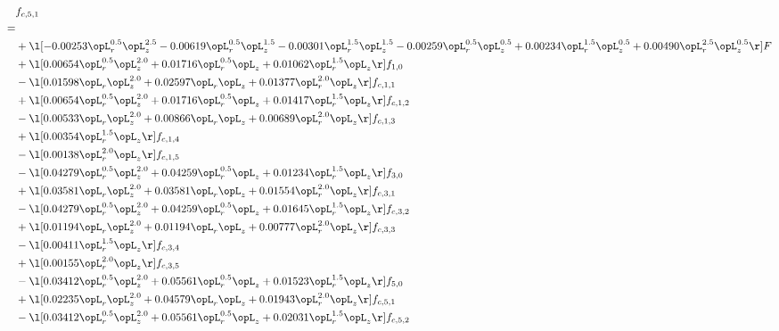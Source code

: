 \begin{alignat}{2} 
\label{eq:f_51_1} 
& f_{c,5,1} \nonumber \\ 
 = \\ 
& + \l[  -0.00253 \opL_r^{0.5} \opL_z^{2.5}   -0.00619 \opL_r^{0.5} \opL_z^{1.5}   -0.00301 \opL_r^{1.5} \opL_z^{1.5}   -0.00259 \opL_r^{0.5} \opL_z^{0.5} +  0.00234 \opL_r^{1.5} \opL_z^{0.5} +  0.00490 \opL_r^{2.5} \opL_z^{0.5}  \r] F \nonumber \\ 
& + \l[  0.00654 \opL_r^{0.5} \opL_z^{2.0} +  0.01716 \opL_r^{0.5} \opL_z +  0.01062 \opL_r^{1.5} \opL_z  \r] f_{1,0} \nonumber \\ 
& - \l[  0.01598 \opL_r \opL_z^{2.0} +  0.02597 \opL_r \opL_z +  0.01377 \opL_r^{2.0} \opL_z  \r] f_{c,1,1} \nonumber \\ 
& + \l[  0.00654 \opL_r^{0.5} \opL_z^{2.0} +  0.01716 \opL_r^{0.5} \opL_z +  0.01417 \opL_r^{1.5} \opL_z  \r] f_{c,1,2} \nonumber \\ 
& - \l[  0.00533 \opL_r \opL_z^{2.0} +  0.00866 \opL_r \opL_z +  0.00689 \opL_r^{2.0} \opL_z  \r] f_{c,1,3} \nonumber \\ 
& + \l[  0.00354 \opL_r^{1.5} \opL_z  \r] f_{c,1,4} \nonumber \\ 
& - \l[  0.00138 \opL_r^{2.0} \opL_z  \r] f_{c,1,5} \nonumber \\ 
& - \l[  0.04279 \opL_r^{0.5} \opL_z^{2.0} +  0.04259 \opL_r^{0.5} \opL_z +  0.01234 \opL_r^{1.5} \opL_z  \r] f_{3,0} \nonumber \\ 
& + \l[  0.03581 \opL_r \opL_z^{2.0} +  0.03581 \opL_r \opL_z +  0.01554 \opL_r^{2.0} \opL_z  \r] f_{c,3,1} \nonumber \\ 
& - \l[  0.04279 \opL_r^{0.5} \opL_z^{2.0} +  0.04259 \opL_r^{0.5} \opL_z +  0.01645 \opL_r^{1.5} \opL_z  \r] f_{c,3,2} \nonumber \\ 
& + \l[  0.01194 \opL_r \opL_z^{2.0} +  0.01194 \opL_r \opL_z +  0.00777 \opL_r^{2.0} \opL_z  \r] f_{c,3,3} \nonumber \\ 
& - \l[  0.00411 \opL_r^{1.5} \opL_z  \r] f_{c,3,4} \nonumber \\ 
& + \l[  0.00155 \opL_r^{2.0} \opL_z  \r] f_{c,3,5} \nonumber \\ 
& - \l[  0.03412 \opL_r^{0.5} \opL_z^{2.0} +  0.05561 \opL_r^{0.5} \opL_z +  0.01523 \opL_r^{1.5} \opL_z  \r] f_{5,0} \nonumber \\ 
& + \l[  0.02235 \opL_r \opL_z^{2.0} +  0.04579 \opL_r \opL_z +  0.01943 \opL_r^{2.0} \opL_z  \r] f_{c,5,1} \nonumber \\ 
& - \l[  0.03412 \opL_r^{0.5} \opL_z^{2.0} +  0.05561 \opL_r^{0.5} \opL_z +  0.02031 \opL_r^{1.5} \opL_z  \r] f_{c,5,2} \nonumber \\ 

\end{alignat}
